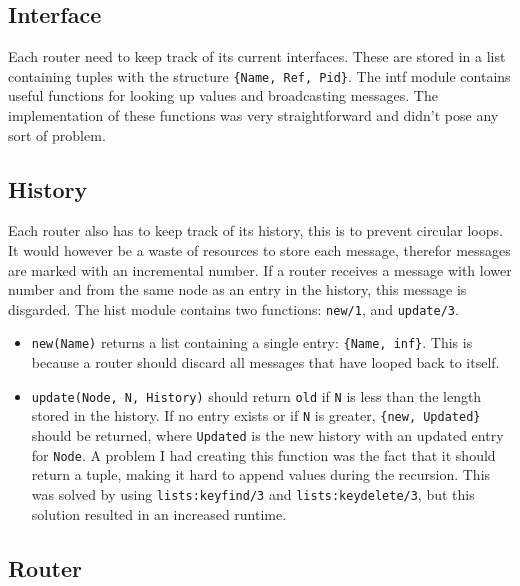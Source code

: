 \documentclass[a4paper, 11pt]{article}
\begin{document}
\subsection{Interface}

Each router need to keep track of its current interfaces. These are stored in a list containing tuples with the structure \texttt{\{Name, Ref, Pid\}}. The intf module contains useful functions for looking up values and broadcasting messages. The implementation of these functions was very straightforward and didn't pose any sort of problem.

\subsection{History}

Each router also has to keep track of its history, this is to prevent circular loops. It would however be a waste of resources to store each message, therefor messages are marked with an incremental number. If a router receives a message with lower number and from the same node as an entry in the history, this message is disgarded. The hist module contains two functions: \texttt{new/1}, and \texttt{update/3}.

\begin{itemize}

\item \texttt{new(Name)} returns a list containing a single entry: \texttt{\{Name, inf\}}. This is because a router should discard all messages that have looped back to itself.

\item \texttt{update(Node, N, History)} should return \texttt{old} if \texttt{N} is less than the length stored in the history. If no entry exists or if \texttt{N} is greater, \texttt{\{new, Updated\}} should be returned, where \texttt{Updated} is the new history with an updated entry for \texttt{Node}. A problem I had creating this function was the fact that it should return a tuple, making it hard to append values during the recursion. This was solved by using \texttt{lists:keyfind/3} and \texttt{lists:keydelete/3}, but this solution resulted in an increased runtime.

\end{itemize}

\subsection{Router}
\end{document}
